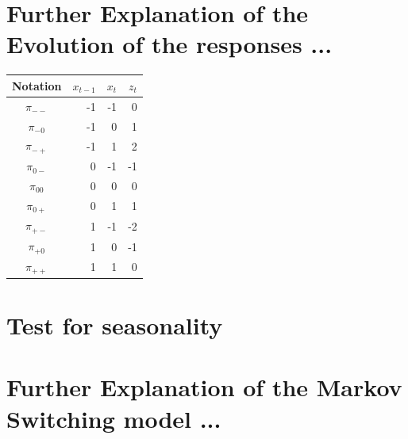 \documentclass[12pt,a4paper,oneside]{book}
\begin{document}
\newpage
\section*{Further Explanation of the Evolution of the responses ...}
\label{sec:appendix explanations EIR}

\begin{center}
\begin{tabular}{|c|r|r|r|}
Notation    &  $x_{t-1}$ & $x_t$ & $z_t$ \\\hline
$\pi_{--}$    &  -1  & -1    & 0 \\
$\pi_{-0}$    &  -1  & 0     & 1 \\
$\pi_{-+}$    &  -1  & 1     & 2 \\
$\pi_{0-}$    &  0   & -1    & -1 \\
$\pi_{00}$    &  0   & 0     & 0 \\
$\pi_{0+}$    &  0   & 1     & 1 \\
$\pi_{+-}$    &  1   & -1    & -2 \\
$\pi_{+0}$    &  1   & 0     & -1 \\
$\pi_{++}$    &  1   & 1     & 0 \\
\end{tabular}  
\end{center}

\newpage

\section*{Test for seasonality}
\label{sec:test for seasonality}

\newpage
\section*{Further Explanation of the Markov Switching model ...}
\end{document}
